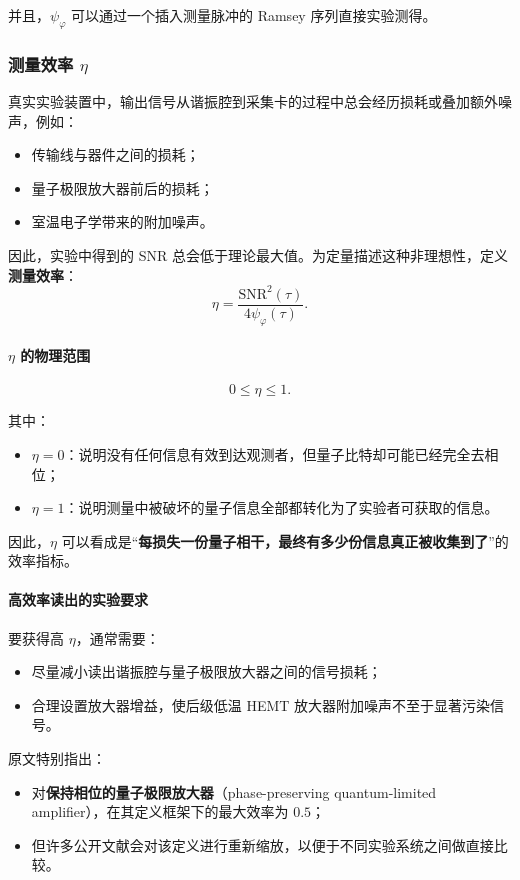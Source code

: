 \documentclass[12pt,a4paper,oneside]{ctexbook}
\begin{document}
并且，\(\psi_\varphi\) 可以通过一个插入测量脉冲的 Ramsey 序列直接实验测得。

\subsubsection{测量效率 \(\eta\)}

真实实验装置中，输出信号从谐振腔到采集卡的过程中总会经历损耗或叠加额外噪声，例如：
\begin{itemize}
    \item 传输线与器件之间的损耗；
    \item 量子极限放大器前后的损耗；
    \item 室温电子学带来的附加噪声。
\end{itemize}

因此，实验中得到的 SNR 总会低于理论最大值。为定量描述这种非理想性，定义\textbf{测量效率}：
\begin{equation}
\eta=\frac{\mathrm{SNR}^2(\tau)}{4\psi_\varphi(\tau)}.
\tag{68}
\end{equation}

\paragraph{\(\eta\) 的物理范围}
\[
0\le \eta \le 1.
\]

其中：
\begin{itemize}
    \item \(\eta=0\)：说明没有任何信息有效到达观测者，但量子比特却可能已经完全去相位；
    \item \(\eta=1\)：说明测量中被破坏的量子信息全部都转化为了实验者可获取的信息。
\end{itemize}

因此，\(\eta\) 可以看成是“\textbf{每损失一份量子相干，最终有多少份信息真正被收集到了}”的效率指标。

\paragraph{高效率读出的实验要求}
要获得高 \(\eta\)，通常需要：
\begin{itemize}
    \item 尽量减小读出谐振腔与量子极限放大器之间的信号损耗；
    \item 合理设置放大器增益，使后级低温 HEMT 放大器附加噪声不至于显著污染信号。
\end{itemize}

原文特别指出：
\begin{itemize}
    \item 对\textbf{保持相位的量子极限放大器}（phase-preserving quantum-limited amplifier），在其定义框架下的最大效率为 \(0.5\)；
    \item 但许多公开文献会对该定义进行重新缩放，以便于不同实验系统之间做直接比较。
\end{itemize}
\end{document}
